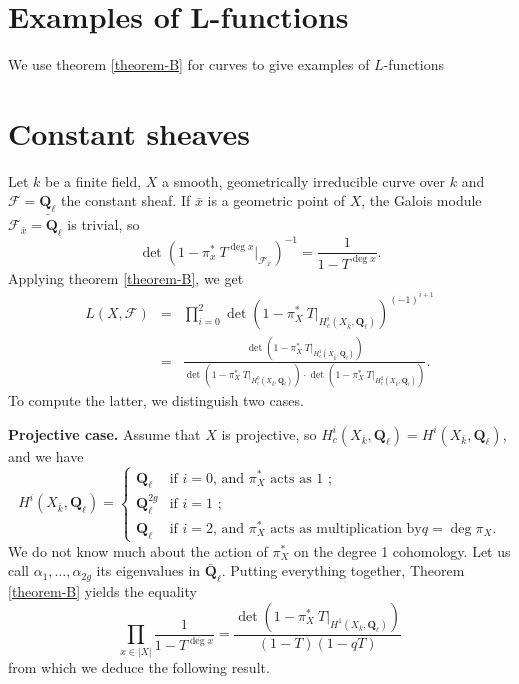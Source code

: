 \section{Examples of L-functions}
\label{section-examples-L-functions}

\noindent
We use theorem \ref{theorem-B} for curves to give examples of $L$-functions





\section{Constant sheaves}
\label{section-L-function-constant-sheaf}

\noindent
Let $k$ be a finite field, $X$ a smooth, geometrically irreducible curve over
$k$ and $\mathcal{F} = \underline{\mathbf{Q}_\ell}$ the constant sheaf. If
$\bar x$ is a geometric point of $X$, the Galois module
$\mathcal{F}_{\bar x} = \mathbf{Q}_\ell$ is trivial, so
$$
\det\left(1-\pi_x^*\ T^{\deg x}\Big|_{\mathcal{F}_{\bar x}}\right)^{-1} =
\frac{1}{1-T^{\deg x}}.
$$
Applying theorem \ref{theorem-B}, we get
\begin{eqnarray*}
L(X, \mathcal{F}) & = & \prod_{i=0}^2 \det\left(1-\pi_X^*\
T\big|_{H_c^i(X_{\bar k}, \mathbf{Q}_\ell)}\right)^{(-1)^{i+1}} \\
& = &
\frac{\det\left(1-\pi_X^*\ T\big|_{H_c^1(X_{\bar k},
\mathbf{Q}_\ell)}\right)}{\det\left(1-\pi_X^*\ T\big|_{H_c^0(X_{\bar k},
\mathbf{Q}_\ell)}\right)\cdot\det\left(1-\pi_X^*\ T\big|_{H_c^2(X_{\bar k},
\mathbf{Q}_\ell)}\right)}.
\end{eqnarray*}
To compute the latter, we distinguish two cases.


\medskip\noindent
{\bf Projective case.}
Assume that $X$ is projective, so $H_c^i(X_{\bar k}, \mathbf{Q}_\ell) =
H^i(X_{\bar k}, \mathbf{Q}_\ell)$, and we have
$$
H^i(X_{\bar k}, \mathbf{Q}_\ell) =
\left\{
\begin{matrix}
\mathbf{Q}_\ell & \text{if $i = 0$, and $\pi_X^*$ acts as 1 ;} \\
\mathbf{Q}_\ell^{2g} & \text{if $i = 1$ ;} \\
\mathbf{Q}_\ell & \text{if $i = 2$, and $\pi_X^*$ acts as multiplication by
$q=\deg \pi_X$.}
\end{matrix}
\right.
$$
We do not know much about the action of $\pi_X^*$ on the degree 1 cohomology.
Let us call $\alpha_1, \ldots, \alpha_{2g}$ its eigenvalues in
$\bar{\mathbf{Q}}_\ell$. Putting everything together,
Theorem \ref{theorem-B}
yields the equality
$$
\prod_{x\in |X|} \frac{1}{1-T^{\deg x}} = \frac{\det\left(1- \pi_X^*\
T\big|_{H^1(X_{\bar k}, \mathbf{Q}_\ell)}\right)}{(1-T)(1-qT)}
$$
from which we deduce the following result.


